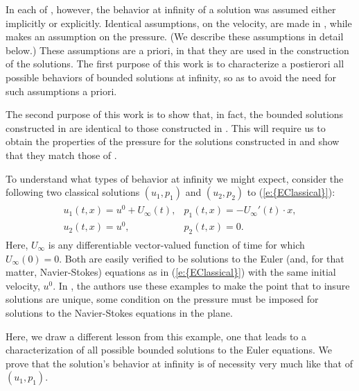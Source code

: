 \documentclass[reqno,openright,11pt,twoside]{amsart}
\theoremstyle{definition}
\numberwithin{equation}{section}
\begin{document}
In each of \cite{Serfati1995A, Taniuchi2004, AKLL2014}, however, the behavior at infinity of a solution was assumed either implicitly or explicitly. Identical assumptions, on the velocity, are made in \cite{Serfati1995A, AKLL2014}, while \cite{Taniuchi2004} makes an assumption on the pressure. (We describe these assumptions in detail below.) These assumptions are a priori, in that they are used in the construction of the solutions. The first purpose of this work is to characterize a postierori all possible behaviors of bounded solutions at infinity, so as to avoid the need for such assumptions a priori.

The second purpose of this work is to show that, in fact, the bounded solutions constructed in \cite{Serfati1995A, AKLL2014} are identical to those constructed in \cite{Taniuchi2004}. This will require us to obtain the properties of the pressure for the solutions constructed in \cite{Serfati1995A, AKLL2014} and show that they match those of \cite{Taniuchi2004}.

{} 

To understand what types of behavior at infinity we might expect, consider
the following two classical solutions $(u_1, p_1)$ and $(u_2, p_2)$ to {(\ref{e:{EClassical}})}:
\begin{align}\label{e:JunKatoExamples}
    \begin{array}{ll}
        u_1(t, x) = u^0 + U_{\ensuremath{\infty}}(t), &p_1(t, x) = - U_{\ensuremath{\infty}}'(t) \cdot x, \\   
        u_2(t, x) = u^0, &p_2(t, x) = 0.
    \end{array}   
\end{align}
Here, $U_{\ensuremath{\infty}}$ is any differentiable vector-valued function of time for which $U_{\ensuremath{\infty}}(0) = 0$.
Both are easily verified to be solutions to the Euler (and, for that matter, Navier-Stokes) equations as in {(\ref{e:{EClassical}})} with the same initial velocity, $u^0$. In \cite{GKKM2001, JunKato2003}, the authors use these examples to make the point that to insure solutions are unique, some condition on the pressure must be imposed for solutions to the Navier-Stokes equations in the plane.
 
Here, we draw a different lesson from this example, one that leads to a characterization of all possible bounded solutions to the Euler equations. We prove that the solution's behavior at infinity is of necessity very much like that of $(u_1, p_1)$.
\end{document}
